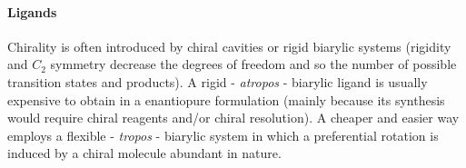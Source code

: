 \paragraph{Ligands} Chirality is often introduced by chiral cavities or rigid biarylic systems (rigidity and $C_{2}$ symmetry decrease the degrees of freedom and so the number of possible transition states and products). A rigid - \emph{atropos} - biarylic ligand is usually expensive to obtain in a enantiopure formulation (mainly because its synthesis would require chiral reagents and/or chiral resolution). A cheaper and easier way employs a flexible - \emph{tropos} -  biarylic system in which a preferential rotation is induced by a chiral molecule abundant in nature.

  







